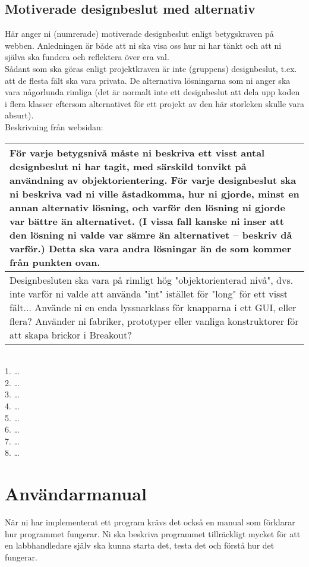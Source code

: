 \subsection{Motiverade designbeslut med alternativ}
Här anger ni (numrerade) motiverade designbeslut enligt betygskraven på webben.  Anledningen är både att ni ska visa oss hur ni har tänkt och att ni själva ska fundera och reflektera över era val.\\
Sådant som ska göras enligt projektkraven är inte (gruppens) designbeslut, t.ex. att de flesta fält ska vara privata.  De alternativa lösningarna som ni anger ska vara någorlunda rimliga (det är normalt inte ett designbeslut att dela upp koden i flera klasser eftersom alternativet för ett projekt av den här storleken skulle vara absurt).\\
Beskrivning från websidan:\\
\begin{tabular}{| p{11cm} |}
    \hline
    För varje betygsnivå måste ni beskriva ett visst antal designbeslut ni har tagit, med särskild tonvikt på användning av objektorientering. För varje designbeslut ska ni beskriva vad ni ville åstadkomma, hur ni gjorde, minst en annan alternativ lösning, och varför den lösning ni gjorde var bättre än alternativet. (I vissa fall kanske ni inser att den lösning ni valde var sämre än alternativet – beskriv då varför.) Detta ska vara andra lösningar än de som kommer från punkten ovan. \\ \hline
    Designbesluten ska vara på rimligt hög "objektorienterad nivå", dvs. inte varför ni valde att använda "int" istället för "long" för ett visst fält... Använde ni en enda lyssnarklass för knapparna i ett GUI, eller flera? Använder ni fabriker, prototyper eller vanliga konstruktorer för att skapa brickor i Breakout? \\ \hline
\end{tabular}\\\vspace{11pt}
1. \ldots \\
2. \ldots \\
3. \ldots \\
4. \ldots \\
5. \ldots \\
6. \ldots \\
7. \ldots \\
8. \ldots \\
\section{Användarmanual}
När ni har implementerat ett program krävs det också en manual som förklarar hur programmet fungerar. Ni ska beskriva programmet tillräckligt mycket för att en labbhandledare själv ska kunna starta det, testa det och förstå hur det fungerar. \\

